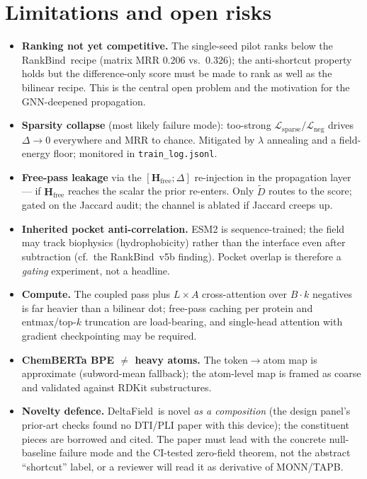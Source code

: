 \documentclass[11pt,a4paper]{article}
\newcommand{\df}{DeltaField\xspace}
\newcommand{\method}{RankBind\xspace}
\newcommand{\Hfree}{\mathbf{H}_{\text{free}}}
\begin{document}
\section{Limitations and open risks}
\label{sec:limitations}

\begin{itemize}[leftmargin=*,itemsep=0pt,topsep=1pt]
  \item \textbf{Ranking not yet competitive.} The single-seed pilot ranks
        below the \method\ recipe (matrix MRR $0.206$ vs.\ $0.326$); the
        anti-shortcut property holds but the difference-only score must be
        made to rank as well as the bilinear recipe. This is the central open
        problem and the motivation for the GNN-deepened propagation.
  \item \textbf{Sparsity collapse} (most likely failure mode): too-strong
        $\mathcal{L}_{\text{sparse}}/\mathcal{L}_{\text{neg}}$ drives
        $\Delta\to0$ everywhere and MRR to chance. Mitigated by $\lambda$
        annealing and a field-energy floor; monitored in
        \texttt{train\_log.jsonl}.
  \item \textbf{Free-pass leakage} via the $[\Hfree;\Delta]$ re-injection in
        the propagation layer --- if $\Hfree$ reaches the scalar the prior
        re-enters. Only $\tilde{D}$ routes to the score; gated on the Jaccard
        audit; the channel is ablated if Jaccard creeps up.
  \item \textbf{Inherited pocket anti-correlation.} ESM2 is sequence-trained;
        the field may track biophysics (hydrophobicity) rather than the
        interface even after subtraction (cf.\ the \method\ v5b finding).
        Pocket overlap is therefore a \emph{gating} experiment, not a headline.
  \item \textbf{Compute.} The coupled pass plus $L\times A$ cross-attention
        over $B\cdot k$ negatives is far heavier than a bilinear dot;
        free-pass caching per protein and entmax/top-$k$ truncation are
        load-bearing, and single-head attention with gradient checkpointing
        may be required.
  \item \textbf{ChemBERTa BPE $\ne$ heavy atoms.} The token$\to$atom map is
        approximate (subword-mean fallback); the atom-level map is framed as
        coarse and validated against RDKit substructures.
  \item \textbf{Novelty defence.} \df\ is novel \emph{as a composition} (the
        design panel's prior-art checks found no DTI/PLI paper with this
        device); the constituent pieces are borrowed and cited. The paper must
        lead with the concrete null-baseline failure mode and the CI-tested
        zero-field theorem, not the abstract ``shortcut'' label, or a reviewer
        will read it as derivative of MONN/TAPB.
\end{itemize}
\end{document}
